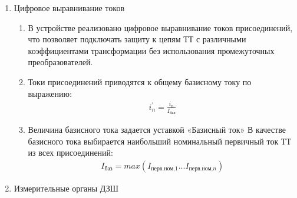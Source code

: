 \begin{enumerate}[label=\arabic{section}.\arabic{subsection}.\arabic{enumi}, labelsep=4pt, leftmargin=0pt, itemindent=57pt, itemsep=0pt, parsep=5pt]
\item Цифровое выравнивание токов

\begin{enumerate}[label=\arabic{section}.\arabic{subsection}.\arabic{enumi}.\arabic*, labelsep=4pt, leftmargin=0em, itemindent=65pt, parsep=0pt]

\item
В устройстве реализовано цифровое выравнивание токов присоединений, что позволяет подключать защиту к цепям ТТ с различными коэффициентами трансформации без использования промежуточных преобразователей.

\item
Токи присоединений приводятся к общему базисному току по выражению:
\begin{align}
i_n^{'}=\frac{i_n}{I_\textit{баз}}
\end{align}

\item
Величина базисного тока задается уставкой «Базисный ток» В качестве базисного тока выбирается наибольший номинальный первичный ток ТТ из всех присоединений:
\begin{align}
I_\textit{баз}=max(I_\textit{перв.ном,1}...I_\textit{перв.ном,n})
\end{align}

\end{enumerate}


\item Измерительные органы ДЗШ

\begin{enumerate}[label=\arabic{section}.\arabic{subsection}.\arabic{enumi}.\arabic*, labelsep=4pt, leftmargin=0em, itemindent=65pt, parsep=0pt]


\end{enumerate}
\end{enumerate}
